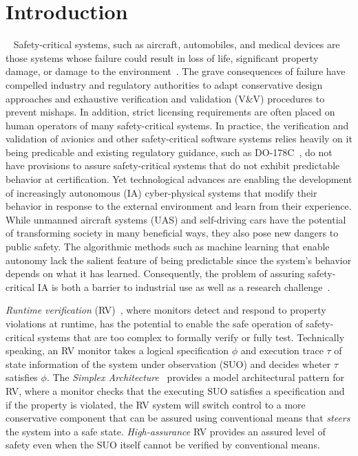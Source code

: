 \section{Introduction}~\label{sec:intro} Safety-critical systems, such
as aircraft, automobiles, and medical devices are those systems whose
failure could result in loss of life, significant property damage, or
damage to the environment~\cite{Knight2002}.  The grave consequences
of failure have compelled industry and regulatory authorities to adapt
conservative design approaches and exhaustive verification and
validation (V\&V) procedures to prevent mishaps. In addition, strict
licensing requirements are often placed on human operators of many
safety-critical systems.  In practice, the verification and validation
of avionics and other safety-critical software systems relies heavily
on it being predicable and existing regulatory guidance, such as
DO-178C~\cite{DO178B}, do not have provisions to assure
safety-critical systems that do not exhibit predictable behavior at
certification.  Yet technological advances are enabling the
development of increasingly autonomous (IA) cyber-physical systems
that modify their behavior in response to the external environment and
learn from their experience.  While unmanned aircraft systems (UAS)
and self-driving cars have the potential of transforming society in
many beneficial ways, they also pose new dangers to public safety. The
algorithmic methods such as machine learning that enable autonomy lack
the salient feature of being predictable since the system's behavior
depends on what it has learned.  Consequently, the problem of assuring
safety-critical IA is both a barrier to industrial use  as well as a
research challenge~\cite{NRC14}.


\emph{Runtime verification} (RV)~\cite{monitors}, where monitors
detect and respond to property violations at runtime, has the
potential to enable the safe operation of safety-critical systems that
are too complex to formally verify or fully test.  Technically
speaking, an RV monitor takes a logical specification $\phi$ and
execution trace $\tau$ of state information of the system under
observation (SUO) and decides wheter $\tau$ satisfies $\phi$. The
\emph{Simplex Architecture}~\cite{simplex} provides a model
architectural pattern for RV, where a monitor checks that the
executing SUO satisfies a specification and if the property is
violated, the RV system will switch control to a more conservative
component that can be assured using conventional means that
\emph{steers} the system into a safe state. \emph{High-assurance} RV
provides an assured level of safety even when the SUO itself cannot be
verified by conventional means.

